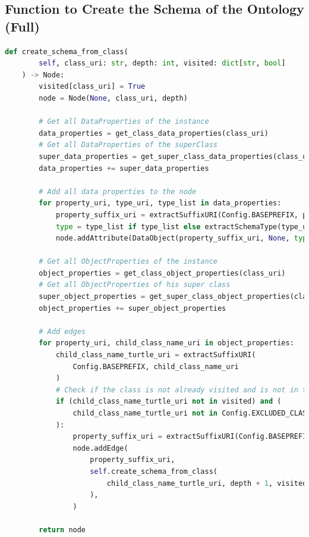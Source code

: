 \clearpage
\subsection{Function to Create the Schema of the Ontology (Full)\label{annex:create-schema-full}}

\begin{lstlisting}[language=Python, caption=Function to Create the Schema of the Ontology (Full), label={lst:create-schema-full}]
def create_schema_from_class(
        self, class_uri: str, depth: int, visited: dict[str, bool]
    ) -> Node:
        visited[class_uri] = True
        node = Node(None, class_uri, depth)

        # Get all DataProperties of the instance
        data_properties = get_class_data_properties(class_uri)
        # Get all DataProperties of the superClass
        super_data_properties = get_super_class_data_properties(class_uri)
        data_properties += super_data_properties

        # Add all data properties to the node
        for property_uri, type_uri, type_list in data_properties:
            property_suffix_uri = extractSuffixURI(Config.BASEPREFIX, property_uri)
            type = type_list if type_list else extractSchemaType(type_uri)
            node.addAttribute(DataObject(property_suffix_uri, None, type, depth))

        # Get all ObjectProperties of the instance
        object_properties = get_class_object_properties(class_uri)
        # Get all ObjectProperties of his super class
        super_object_properties = get_super_class_object_properties(class_uri)
        object_properties += super_object_properties

        # Add edges
        for property_uri, child_class_name_uri in object_properties:
            child_class_name_turtle_uri = extractSuffixURI(
                Config.BASEPREFIX, child_class_name_uri
            )
            # Check if the class is not already visited and is not in the list of excluded classes
            if (child_class_name_turtle_uri not in visited) and (
                child_class_name_turtle_uri not in Config.EXCLUDED_CLASSES
            ):
                property_suffix_uri = extractSuffixURI(Config.BASEPREFIX, property_uri)
                node.addEdge(
                    property_suffix_uri,
                    self.create_schema_from_class(
                        child_class_name_turtle_uri, depth + 1, visited
                    ),
                )

        return node
\end{lstlisting}



